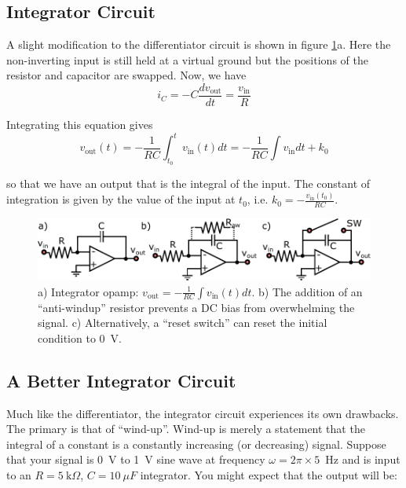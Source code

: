 \documentclass{tufte-book}
\begin{document}
\subsection{Integrator Circuit}
A slight modification to the differentiator circuit is shown in figure \ref{fig:integrator_opamp}a. Here the non-inverting input is still held at a virtual ground but the positions of the resistor and capacitor are swapped. Now, we have
$$
i_C = -C\frac{dv_\text{out}}{dt} = \frac{v_\text{in}}{R}
$$

Integrating this equation gives
\begin{equation}
\label{eq:opamp_integrator}
v_\text{out}(t) = -\frac{1}{RC}\int_{t_0}^{t}v_\text{in}(t)dt =  -\frac{1}{RC}\int v_\text{in}dt + k_0
\end{equation}

\noindent so that we have an output that is the integral of the input. The constant of integration is given by the value of the input at $t_0$, i.e. $k_0 = -\frac{v_\text{in}(t_0)}{RC}$.

\begin{figure}[ht]
\caption{a) Integrator opamp: $v_\text{out} = -\frac{1}{RC}\int v_\text{in}(t)dt$. b) The addition of an ``anti-windup'' resistor prevents a DC bias from overwhelming the signal. c) Alternatively, a ``reset switch'' can reset the initial condition to 0~V.}
\label{fig:integrator_opamp}
	\begin{center}
		\includegraphics[width = \textwidth]{Images/integrator_opamp.pdf}
	\end{center}
\end{figure}

\subsection{A Better Integrator Circuit}
Much like the differentiator, the integrator circuit experiences its own drawbacks. The primary is that of ``wind-up''. Wind-up is merely a statement that the integral of a constant is a constantly increasing (or decreasing) signal. Suppose that your signal is 0~V to 1~V sine wave at frequency $\omega = 2\pi\times5$~Hz and is input to an $R =  5~\text{k}\Omega$, $C = 10~\mu F$ integrator. You might expect that the output will be:
\end{document}
